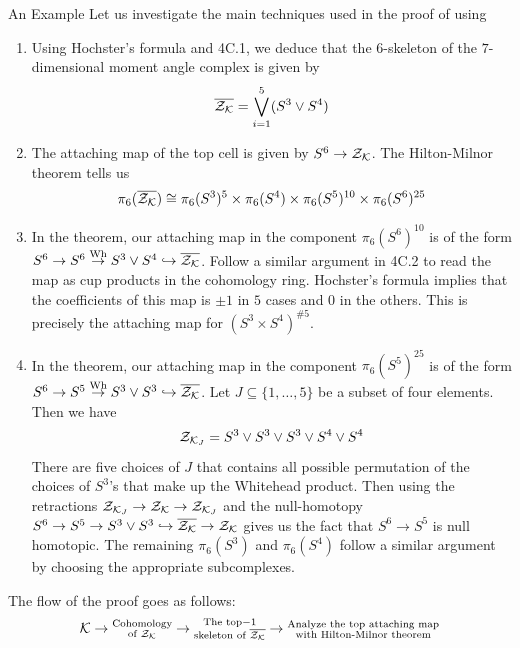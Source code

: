 \documentclass[final]{beamer}
\begin{document}
\begin{frame}[t]
\begin{columns}[t]
\begin{column}{\colwidth}
  \begin{alertblock}{An Example}
Let us investigate the main techniques used in the proof of \cite{Amaranta} using
\begin{center}
\end{center}
\begin{enumerate}
\item Using Hochster's formula and \cite{Hatcher} 4C.1, we deduce that the $6$-skeleton of the $7$-dimensional moment angle complex is given by $$\overline{\mathcal{Z}_{\mathcal{K}}}=\bigvee_{i=1}^5(S^3\vee S^4)$$
\item The attaching map of the top cell is given by $S^6\to\mathcal{Z}_{\mathcal{K}}$. The Hilton-Milnor theorem tells us $$\pi_6(\overline{\mathcal{Z}_{\mathcal{K}}})\cong\pi_6(S^3)^5\times\pi_6(S^4)\times\pi_6(S^5)^{10}\times\pi_6(S^6)^{25}$$
\item In the theorem, our attaching map in the component $\pi_6(S^6)^{10}$ is of the form $S^6\to S^6\overset{\text{Wh}}{\to} S^3\vee S^4\hookrightarrow\overline{\mathcal{Z}_{\mathcal{K}}}$. Follow a similar argument in \cite{Hatcher} 4C.2 to read the map as cup products in the cohomology ring. Hochster's formula implies that the coefficients of this map is $\pm1$ in $5$ cases and $0$ in the others. This is precisely the attaching map for $(S^3\times S^4)^{\#5}$. 
\item In the theorem, our attaching map in the component $\pi_6(S^5)^{25}$ is of the form $S^6\to S^5\overset{\text{Wh}}{\to} S^3\vee S^3\hookrightarrow\overline{\mathcal{Z}_{\mathcal{K}}}$. Let $J\subseteq\{1,\dots,5\}$ be a subset of four elements. Then we have $$\mathcal{Z}_{\mathcal{K}_J}=S^3\vee S^3\vee S^3\vee S^4\vee S^4$$ There are five choices of $J$ that contains all possible permutation of the choices of $S^3$'s that make up the Whitehead product. Then using the retractions $\mathcal{Z}_{\mathcal{K}_J}\to\mathcal{Z}_{\mathcal{K}}\to\mathcal{Z}_{\mathcal{K}_J}$ and the null-homotopy $S^6\to S^5\to S^3\vee S^3\hookrightarrow\overline{\mathcal{Z}_{\mathcal{K}}}\to\mathcal{Z}_{\mathcal{K}}$ gives us the fact that $S^6\to S^5$ is null homotopic. The remaining $\pi_6(S^3)$ and $\pi_6(S^4)$ follow a similar argument by choosing the appropriate subcomplexes. 
\end{enumerate}
The flow of the proof goes as follows: $$\mathcal{K}\to\substack{\text{Cohomology}\\\text{of }\mathcal{Z}_{\mathcal{K}}}\to\substack{\text{The top}-1\\\text{skeleton of }\overline{\mathcal{Z}_{\mathcal{K}}}}\to\substack{\text{Analyze the top attaching map}\\\text{with Hilton-Milnor theorem}}$$
  \end{alertblock}


\end{column}
\end{columns}
\end{frame}
\end{document}
